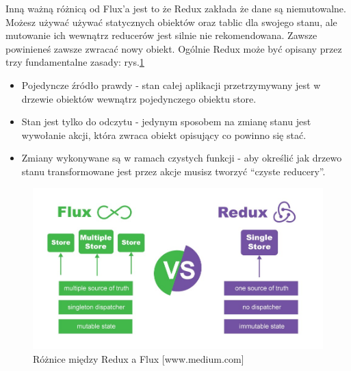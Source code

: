 Inną ważną różnicą od Flux’a jest to że Redux zakłada że dane są niemutowalne. Możesz używać używać statycznych obiektów oraz tablic dla swojego stanu, ale mutowanie ich wewnątrz reducerów jest silnie nie rekomendowana. Zawsze powinieneś zawsze zwracać nowy obiekt. Ogólnie Redux może być opisany przez trzy fundamentalne zasady:
rys.\ref{rys:reduxFlux}
\begin{itemize}
	\item Pojedyncze źródło prawdy - stan całej aplikacji przetrzymywany jest w drzewie obiektów wewnątrz pojedynczego obiektu store.
	\item Stan jest tylko do odczytu - jedynym sposobem na zmianę stanu jest wywołanie akcji, która zwraca obiekt opisujący co powinno się stać.
	\item Zmiany wykonywane są w ramach czystych funkcji - aby określić jak drzewo stanu transformowane jest przez akcje musisz tworzyć “czyste reducery”.
\end{itemize}

\begin{figure}
	\centering\includegraphics[width=.6\textwidth]{img/reduxFlux}
	\caption{Różnice między Redux a Flux [www.medium.com]}\label{rys:reduxFlux}%
\end{figure}